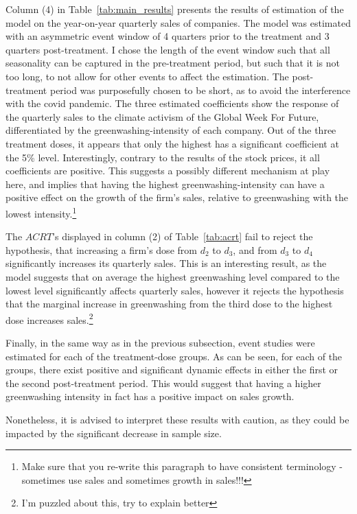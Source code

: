 \documentclass[12pt]{article}
\begin{document}
Column (4) in Table~\ref{tab:main_results} presents the results of estimation of the model on the year-on-year quarterly sales of companies. The model was estimated with an asymmetric event window of 4 quarters prior to the treatment and 3 quarters post-treatment. I chose the length of the event window such that all seasonality can be captured in the pre-treatment period, but such that it is not too long, to not allow for other events to affect the estimation. The post-treatment period was purposefully chosen to be short, as to avoid the interference with the covid pandemic. The three estimated coefficients show the response of the quarterly sales to the climate activism of the Global Week For Future, differentiated by the greenwashing-intensity of each company. Out of the three treatment doses, it appears that only the highest has a significant coefficient at the 5\% level. Interestingly, contrary to the results of the stock prices, it all coefficients are positive. This suggests a possibly different mechanism at play here, and implies that having the highest greenwashing-intensity can have a positive effect on the growth of the firm's sales, relative to greenwashing with the lowest intensity.\footnote{Make sure that you re-write this paragraph to have consistent terminology - sometimes use sales and sometimes growth in sales!!! }

The $ACRT$'s displayed in column (2) of Table~\ref{tab:acrt} fail to reject the hypothesis, that increasing a firm's dose from $d_2$ to $d_3$, and from $d_3$ to $d_4$ significantly increases its quarterly sales. This is an interesting result, as the model suggests that on average the highest greenwashing level compared to the lowest level significantly affects quarterly sales, however it rejects the hypothesis that the marginal increase in greenwashing from the third dose to the highest dose increases sales.\footnote{I'm puzzled about this, try to explain better}

Finally, in the same way as in the previous subsection, event studies were estimated for each of the treatment-dose groups. As can be seen, for each of the groups, there exist positive and significant dynamic effects in either the first or the second post-treatment period. This would suggest that having a higher greenwashing intensity in fact has a positive impact on sales growth.

Nonetheless, it is advised to interpret these results with caution, as they could be impacted by the significant decrease in sample size. 
\end{document}
